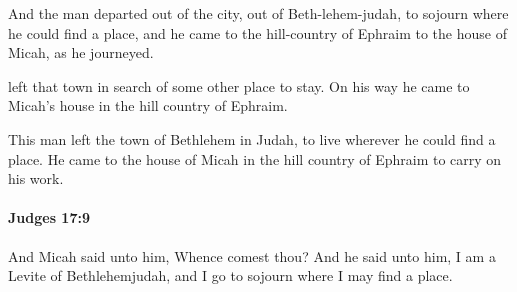			\begin{versebox}
					\item[BHS] 
					\item[ASV] And the man departed out of the city, out of Beth-lehem-judah, to sojourn where he could find a place, and he came to the hill-country of Ephraim to the house of Micah, as he journeyed.
					\item[NIV] left that town in search of some other place to stay. On his way he came to Micah’s house in the hill country of Ephraim.
					\item[NRSV] This man left the town of Bethlehem in Judah, to live wherever he could find a place. He came to the house of Micah in the hill country of Ephraim to carry on his work.
			\end{versebox}

		\paragraph{Judges 17:9} %
			\label{JUDGES-17-9}

			And Micah said unto him, Whence comest thou? And he said unto him, I am a Levite of Bethlehemjudah, and I go to sojourn where I may find a place.

